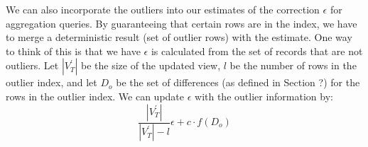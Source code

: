 We can also incorporate the outliers into our estimates of the correction
$\epsilon$ for aggregation queries. By guaranteeing that certain rows are in the index, we
have to merge a deterministic result (set of outlier rows) with the
estimate. One way to think of this is that we have $\epsilon$ is
calculated from the set of records that are not outliers. Let $|V_{T}^{'}|$
be the size of the updated view, $l$ be the number of rows in the
outlier index, and let $D_{o}$ be the set of differences (as defined
in Section ?) for the rows in the outlier index. We can update $\epsilon$
with the outlier information by:
\[
\frac{|V_{T}^{'}|}{|V_{T}^{'}|-l}\epsilon+c\cdot f(D_{o})
\]